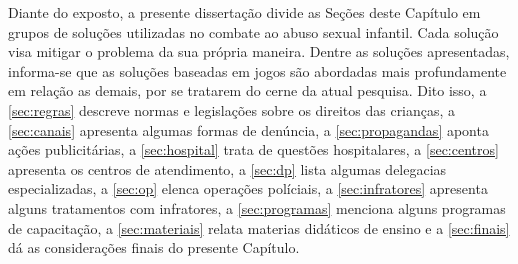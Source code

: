 Diante do exposto, a presente dissertação divide as Seções deste Capítulo em grupos de soluções utilizadas no combate ao abuso sexual infantil. Cada solução visa mitigar o problema da sua própria maneira. Dentre as soluções apresentadas, informa-se que as soluções baseadas em jogos são abordadas mais profundamente em relação as demais, por se tratarem do cerne da atual pesquisa. Dito isso, a \autoref{sec:regras} descreve normas e legislações sobre os direitos das crianças, a \autoref{sec:canais} apresenta algumas formas de denúncia, a \autoref{sec:propagandas} aponta ações publicitárias, a \autoref{sec:hospital} trata de questões hospitalares, a \autoref{sec:centros} apresenta os centros de atendimento, a \autoref{sec:dp} lista algumas delegacias especializadas, a \autoref{sec:op} elenca operações políciais, a \autoref{sec:infratores} apresenta alguns tratamentos com infratores, a \autoref{sec:programas} menciona alguns programas de capacitação, a \autoref{sec:materiais} relata materias didáticos de ensino e a \autoref{sec:finais} dá as considerações finais do presente Capítulo. 
















